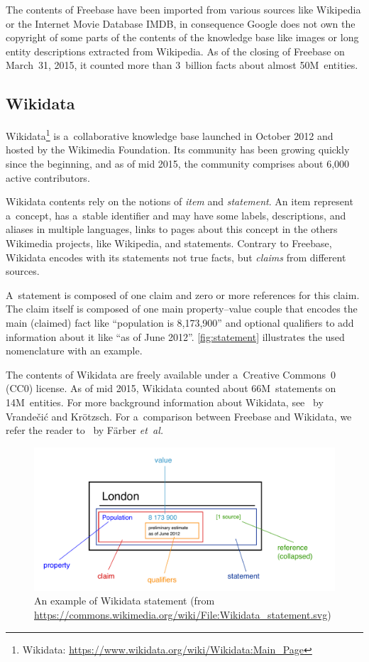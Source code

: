 \documentclass{sig-alternate}
\begin{document}
The contents of Freebase have been imported from various sources like Wikipedia
or the Internet Movie Database IMDB,
in consequence Google does not own the copyright of some parts of the contents of the knowledge base
like images or long entity descriptions extracted from Wikipedia.
As of the closing of Freebase on March~31, 2015,
it counted more than 3~billion facts about almost 50M~entities.

\subsection{Wikidata}

Wikidata\footnote{Wikidata: \url{https://www.wikidata.org/wiki/Wikidata:Main_Page}}
is a~collaborative knowledge base
launched in October 2012 and hosted by the Wikimedia Foundation.
Its community has been growing quickly since the beginning, and as of mid 2015,
the community comprises about 6,000 active contributors.

Wikidata contents rely on the notions of \emph{item} and \emph{statement}.
An item represent a~concept, has a~stable identifier and may have some labels,
descriptions, and aliases in multiple languages, links to pages about this concept
in the others Wikimedia projects, like Wikipedia, and statements.
Contrary to Freebase, Wikidata encodes with its statements not true facts,
but \emph{claims} from different sources.

A~statement is composed of one claim and zero or more references for this claim.
The claim itself is composed of one main property--value couple that encodes
the main (claimed) fact like ``population is 8,173,900'' and optional qualifiers
to add information about it like ``as of June 2012''.
\autoref{fig:statement} illustrates the used nomenclature with an example.

The contents of Wikidata are freely available under a~Creative Commons~0 (CC0) license.
As of mid 2015, Wikidata counted about 66M~statements on 14M~entities.
For more background information about Wikidata, see~\cite{vrandevcic2014wikidata}
by Vrandečić and Krötzsch.
For a~comparison between Freebase and Wikidata,
we refer the reader to~\cite{farbercomparative} by Färber \emph{et~al.}

\begin{figure}[!htbp]
\centering
\includegraphics[width=8.45 cm]{img/Wikidata_statement.pdf}
\caption{An example of Wikidata statement (from
	\url{https://commons.wikimedia.org/wiki/File:Wikidata_statement.svg})}
\label{fig:statement}
\end{figure}
\end{document}

